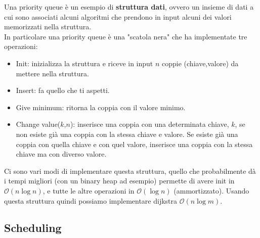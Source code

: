 \documentclass[11pt]{scrartcl}
\newcommand{\bigo}{\mathcal{O}}
\begin{document}
	Una priority queue è un esempio di \textbf{struttura dati}, ovvero un insieme di dati a cui sono associati alcuni algoritmi che prendono in input alcuni dei valori memorizzati nella struttura. \\
	In particolare una priority queue è una "scatola nera" che ha implementate tre operazioni:
	\begin{itemize}
		\item Init: inizializza la struttura e riceve in input $n$ coppie (chiave,valore) da mettere nella struttura.
		\item Insert: fa quello che ti aspetti.
		\item Give minimum: ritorna la coppia con il valore minimo.
		\item Change value($k$,$n$): inserisce una coppia con una determinata chiave, $k$, se non esiste già una coppia con la stessa chiave e valore. Se esiste già una coppia con quella chiave e con quel valore, inserisce una coppia con la stessa chiave ma con diverso valore.
	\end{itemize}
	Ci sono vari modi di implementare questa struttura, quello che probabilmente dà i tempi migliori (con un binary heap ad esempio) permette di avere init in $\bigo(n\log n)$, e tutte le altre operazioni in $\bigo(\log n)$ (ammortizzato). Usando questa struttura quindi possiamo implementare dijkstra $\bigo(n\log m)$.
	
	\subsection{Scheduling}
	
\end{document}
